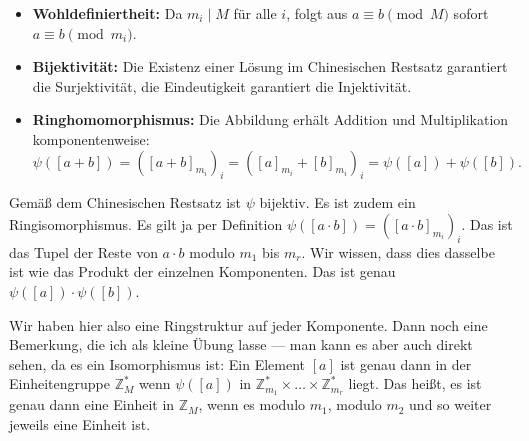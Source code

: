 \begin{math-stroke}

\begin{explanation-of-steps}
\begin{itemize}
    \item \textbf{Wohldefiniertheit:} Da $m_i \mid M$ für alle $i$, folgt aus $a \equiv b \pmod M$ sofort $a \equiv b \pmod{m_i}$.
    \item \textbf{Bijektivität:} Die Existenz einer Lösung im Chinesischen Restsatz garantiert die Surjektivität, die Eindeutigkeit garantiert die Injektivität.
    \item \textbf{Ringhomomorphismus:} Die Abbildung erhält Addition und Multiplikation komponentenweise:
    \[
    \psi([a+b]) = ([a+b]_{m_i})_i = ([a]_{m_i} + [b]_{m_i})_i = \psi([a]) + \psi([b]).
    \]
\end{itemize}
\end{explanation-of-steps}
\end{math-stroke}

\begin{spoken-clean}[01:14:09 - 01:16:24]
Gemäß dem Chinesischen Restsatz ist $\psi$ bijektiv. Es ist zudem ein Ringisomorphismus. Es gilt ja per Definition $\psi([a \cdot b]) = ([a \cdot b]_{m_i})_i$. Das ist das Tupel der Reste von $a \cdot b$ modulo $m_1$ bis $m_r$. Wir wissen, dass dies dasselbe ist wie das Produkt der einzelnen Komponenten. Das ist genau $\psi([a]) \cdot \psi([b])$.

Wir haben hier also eine Ringstruktur auf jeder Komponente. Dann noch eine Bemerkung, die ich als kleine Übung lasse --- man kann es aber auch direkt sehen, da es ein Isomorphismus ist: Ein Element $[a]$ ist genau dann in der Einheitengruppe $\mathbb{Z}_M^*$ wenn $\psi([a])$ in $\mathbb{Z}_{m_1}^* \times \dots \times \mathbb{Z}_{m_r}^*$ liegt. Das heißt, es ist genau dann eine Einheit in $\mathbb{Z}_M$, wenn es modulo $m_1$, modulo $m_2$ und so weiter jeweils eine Einheit ist.
\end{spoken-clean}

